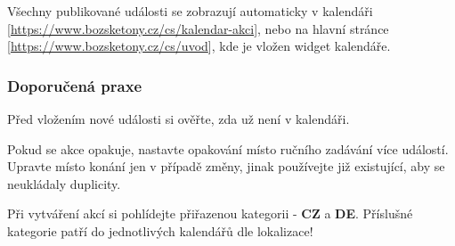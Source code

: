 \documentclass[12pt,a4paper]{article}
\begin{document}
	Všechny publikované události se zobrazují automaticky v kalendáři [\url{https://www.bozsketony.cz/cs/kalendar-akci}], nebo na hlavní stránce [\url{https://www.bozsketony.cz/cs/uvod}], kde je vložen widget kalendáře.
	
	\subsubsection{Doporučená praxe}
	Před vložením nové události si ověřte, zda už není v kalendáři. 
	
	Pokud se akce opakuje, nastavte opakování místo ručního zadávání více událostí. Upravte místo konání jen v případě změny, jinak používejte již existující, aby se neukládaly duplicity.
	
	Při vytváření akcí si pohlídejte přiřazenou kategorii - \textbf{CZ} a \textbf{DE}. Příslušné kategorie patří do jednotlivých kalendářů dle lokalizace!
	
	
\end{document}
